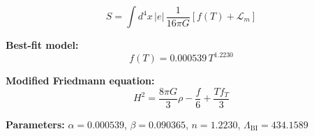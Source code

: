 
\begin{equation}
  S = \int d^4x \, |e| \, \frac{1}{16\pi G} \left[ f(T) + \mathcal{L}_m \right]
\end{equation}

\textbf{Best-fit model:}
\begin{equation}
  f(T) = 0.000539 \, T^{1.2230}
\end{equation}

\textbf{Modified Friedmann equation:}
\begin{equation}
  H^2 = \frac{8\pi G}{3} \rho - \frac{f}{6} + \frac{T f_T}{3}
\end{equation}

\textbf{Parameters:}
$\alpha = 0.000539$, \quad
$\beta = 0.090365$, \quad
$n = 1.2230$, \quad
$\Lambda_{\text{BI}} = 434.1589$
